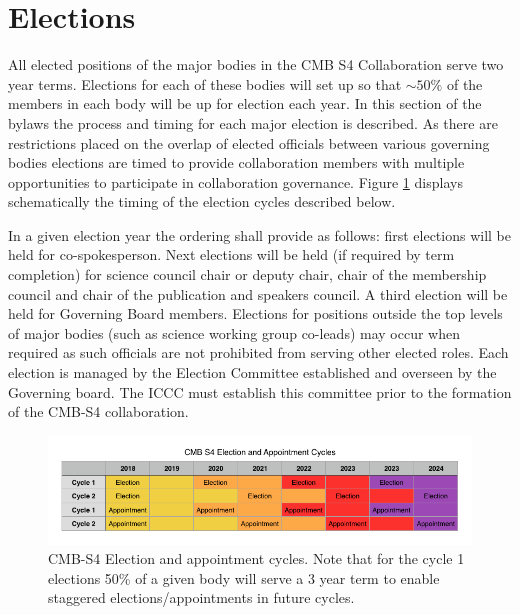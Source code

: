 \documentclass[12pt]{article}
\newcommand{\Comment}[1]{\textcolor{Blue}{(Comment: #1)}}
\begin{document}
\section{Elections}\label{sec:elections}
All elected positions of the major bodies in the CMB S4 Collaboration serve two year terms. Elections for each of these bodies will set up so that $\sim 50\%$ of the members in each body will be up for election each year. In this section of the bylaws the process and timing for each major election is described.  As there are restrictions placed on the overlap of elected officials between various governing bodies elections are timed to provide collaboration members with multiple opportunities to participate in collaboration governance. %
Figure \ref{fig:elect_cycle} displays schematically the timing of the election cycles described below.  

In a given election year the ordering shall provide as follows: first elections will be held for co-spokesperson. Next elections will be held (if required by term completion) for science council chair or deputy chair, chair of the membership council and chair of the publication and speakers council. A third election will be held for Governing Board members. Elections for positions outside the top levels of major bodies (such as science working group co-leads) may occur when required as such officials are not prohibited from serving other elected roles. Each election is managed by the Election Committee established and overseen by the Governing board. The ICCC must establish this committee prior to the formation of the CMB-S4 collaboration. 


\begin{figure}[h!]
\begin{center}
\includegraphics[width=6.5in]{Election_cycle.png}
\end{center}
\caption{CMB-S4 Election and appointment cycles. Note that for the cycle 1 elections 50\% of a given body will serve a 3 year term to enable staggered elections/appointments in future cycles.}
\label{fig:elect_cycle}
\end{figure}
\end{document}
